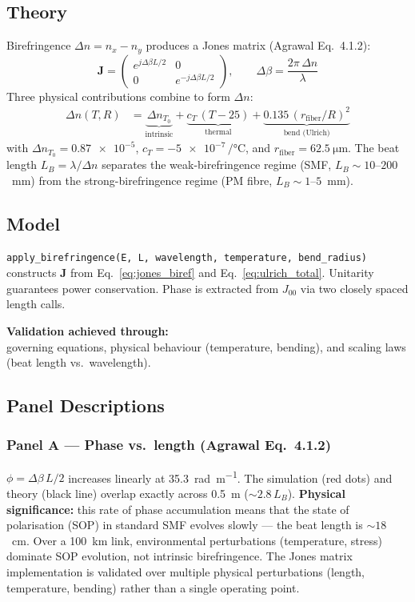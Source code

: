 ﻿\documentclass[11pt,a4paper]{article}
\newcommand{\code}[1]{\texttt{#1}}
\begin{document}
\subsection{Theory}
Birefringence $\Delta n = n_x - n_y$ produces a Jones matrix (Agrawal
Eq.~4.1.2):
\begin{equation}
  \mathbf{J} =
  \begin{pmatrix}
    e^{j\Delta\beta L/2} & 0 \\[2pt]
    0 & e^{-j\Delta\beta L/2}
  \end{pmatrix},
  \qquad
  \Delta\beta = \frac{2\pi\,\Delta n}{\lambda}
  \label{eq:jones_biref}
\end{equation}
Three physical contributions combine to form $\Delta n$:
\begin{align}
  \Delta n(T, R) &=
  \underbrace{\Delta n_{T_0}}_{\text{intrinsic}}
  + \underbrace{c_T\,(T - 25)}_{\text{thermal}}
  + \underbrace{0.135\,(r_\text{fiber}/R)^2}_{\text{bend (Ulrich)}}
  \label{eq:ulrich_total}
\end{align}
with $\Delta n_{T_0} = \num{0.87e-5}$, $c_T = \num{-5e-7}\,\si{\per\celsius}$,
and $r_\text{fiber} = \SI{62.5}{\micro\metre}$.  The beat length
$L_B = \lambda/\Delta n$ separates the weak-birefringence regime (SMF,
$L_B \sim 10$--$200$~\si{\mm}) from the strong-birefringence regime (PM
fibre, $L_B \sim 1$--$5$~\si{\mm}).

\subsection{Model}
\code{apply\_birefringence(E, L, wavelength, temperature, bend\_radius)}
constructs $\mathbf{J}$ from Eq.~\eqref{eq:jones_biref} and
Eq.~\eqref{eq:ulrich_total}.  Unitarity guarantees power conservation.
Phase is extracted from $J_{00}$ via two closely spaced length calls.

\medskip
\noindent\textbf{Validation achieved through:}\\
governing equations, physical behaviour (temperature, bending), and scaling
laws (beat length vs.\ wavelength).

\subsection{Panel Descriptions}

\subsubsection*{Panel A --- Phase vs.\ length (Agrawal Eq.~4.1.2)}
$\phi = \Delta\beta\,L/2$ increases linearly at
\SI{35.3}{\radian\per\metre}.  The simulation (red dots) and theory (black
line) overlap exactly across 0.5~m ($\sim\!2.8\,L_B$).  \textbf{Physical
significance:} this rate of phase accumulation means that the state of
polarisation (SOP) in standard SMF evolves slowly --- the beat length is
$\sim\!18$~cm.  Over a 100~km link, environmental perturbations
(temperature, stress) dominate SOP evolution, not intrinsic birefringence.
The Jones matrix implementation is validated over multiple physical
perturbations (length, temperature, bending) rather than a single operating
point.
\end{document}
